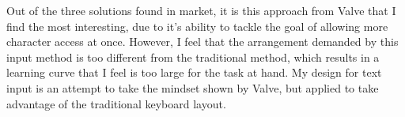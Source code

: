 \documentclass[requirements.tex]{subfiles}
\begin{document}
Out of the three solutions found in market, it is this approach from Valve that
I find the most interesting, due to it's ability to tackle the goal of allowing
more character access at once. However, I feel that the arrangement demanded by
this input method is too different from the traditional method, which results
in a learning curve that I feel is too large for the task at hand. My design for
text input is an attempt to take the mindset shown by Valve, but applied to
take advantage of the traditional keyboard layout.

\newpage
\end{document}
